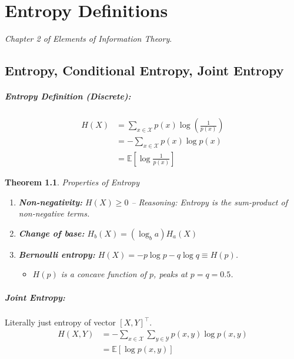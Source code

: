 \documentclass[a4paper,12pt]{report}
\newtheorem{theorem}{Theorem}
\begin{document}
\chapter{Entropy Definitions}
\textit{Chapter 2 of Elements of Information Theory}.


\section{Entropy, Conditional Entropy, Joint Entropy}

\paragraph{Entropy Definition (Discrete): } 
\begin{align}\label{eqn:entropy}
H(X) &= \sum_{x\in \mathcal X} p(x) \log ( \frac{1}{p(x)} ) \\
&= - \sum_{x\in \mathcal X} p(x) \log p(x) \\ 
&= \mathbb{E} [\log \frac {1} {p(x)}] 
\end{align}


\begin{theorem}{Properties of Entropy}
\begin{enumerate}
\item \textbf{Non-negativity: } $H(X) \geq 0$ -- \textit{Reasoning: Entropy is the sum-product of
non-negative terms}.
\item \textbf{Change of base: } $H_b(X) = (\log_b a) H_a(X)$

\item \textbf{Bernoulli entropy: } $H(X) = -p\log p - q \log q \equiv H(p)$.
\begin{itemize}
\item $H(p)$ is a concave function of $p$, peaks at $p=q=0.5$.
\end{itemize}
\end{enumerate}
\end{theorem}



\paragraph{Joint Entropy: } Literally just entropy of vector $[X,Y]^\top$.
\begin{align}
\label{eqn:joint_entropy}
H(X, Y) &= - \sum_{x\in \mathcal X} \sum_{y\in \mathcal Y}^{} p(x,y) \log p(x,y) \\ 
&= \mathbb E [\log p(x,y)] \\
\end{align}
\end{document}
